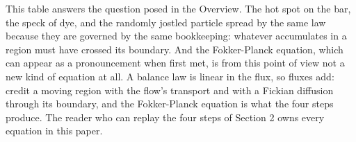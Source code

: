 This table answers the question posed in the Overview. The hot spot on
the bar, the speck of dye, and the randomly jostled particle spread by
the same law because they are governed by the same bookkeeping:
whatever accumulates in a region must have crossed its boundary. And
the Fokker-Planck equation, which can appear as a pronouncement when
first met, is from this point of view not a new kind of equation at
all. A balance law is linear in the flux, so fluxes add: credit a
moving region with the flow's transport and with a Fickian diffusion
through its boundary, and the Fokker-Planck equation is what the four
steps produce. The reader who can replay the four steps of Section 2
owns every equation in this paper.
\bye


